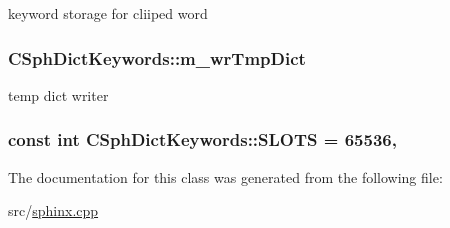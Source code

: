 keyword storage for cliiped word 

\hypertarget{classCSphDictKeywords_a0c0584204b14648d1c1ba190cc7cb49a}{
\subsubsection[{m\-\_\-wr\-Tmp\-Dict}]{ C\-Sph\-Dict\-Keywords\-::m\-\_\-wr\-Tmp\-Dict\hspace{0.3cm}{\ttfamily [private]}}}\label{classCSphDictKeywords_a0c0584204b14648d1c1ba190cc7cb49a}


temp dict writer 

\hypertarget{classCSphDictKeywords_a3ac7bc30b9bf83c02625ef675c5a4c82}{
\subsubsection[{S\-L\-O\-T\-S}]{\setlength{\rightskip}{0pt plus 5cm}const {\bf int} C\-Sph\-Dict\-Keywords\-::\-S\-L\-O\-T\-S = 65536\hspace{0.3cm}{\ttfamily [static]}, {\ttfamily [private]}}}\label{classCSphDictKeywords_a3ac7bc30b9bf83c02625ef675c5a4c82}


The documentation for this class was generated from the following file\-:\begin{DoxyCompactItemize}
\item 
src/\hyperlink{sphinx_8cpp}{sphinx.\-cpp}\end{DoxyCompactItemize}
